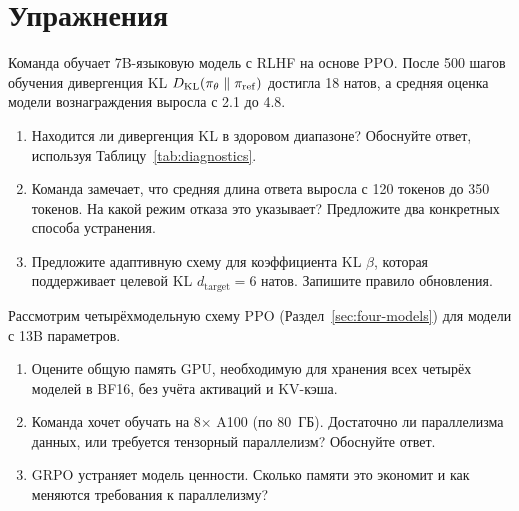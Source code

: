 \section*{Упражнения}

\begin{exercise}
\label{ex:kl-budget}
Команда обучает 7B-языковую модель с RLHF на основе PPO. После 500 шагов обучения дивергенция KL $D_{\mathrm{KL}}\!\left(\pi_\theta\;\|\;\pi_{\mathrm{ref}}\right)$ достигла 18 натов, а средняя оценка модели вознаграждения выросла с 2.1 до 4.8.
\begin{enumerate}
  \item Находится ли дивергенция KL в здоровом диапазоне? Обоснуйте ответ, используя Таблицу~\ref{tab:diagnostics}.
  \item Команда замечает, что средняя длина ответа выросла с 120 токенов до 350 токенов. На какой режим отказа это указывает? Предложите два конкретных способа устранения.
  \item Предложите адаптивную схему для коэффициента KL $\beta$, которая поддерживает целевой KL $d_{\mathrm{target}} = 6$ натов. Запишите правило обновления.
\end{enumerate}
\end{exercise}

\begin{exercise}
\label{ex:four-model-memory}
Рассмотрим четырёхмодельную схему PPO (Раздел~\ref{sec:four-models}) для модели с 13B параметров.
\begin{enumerate}
  \item Оцените общую память GPU, необходимую для хранения всех четырёх моделей в BF16, без учёта активаций и KV-кэша.
  \item Команда хочет обучать на 8$\times$ A100 (по 80~ГБ). Достаточно ли параллелизма данных, или требуется тензорный параллелизм? Обоснуйте ответ.
  \item GRPO устраняет модель ценности. Сколько памяти это экономит и как меняются требования к параллелизму?
\end{enumerate}
\end{exercise}

